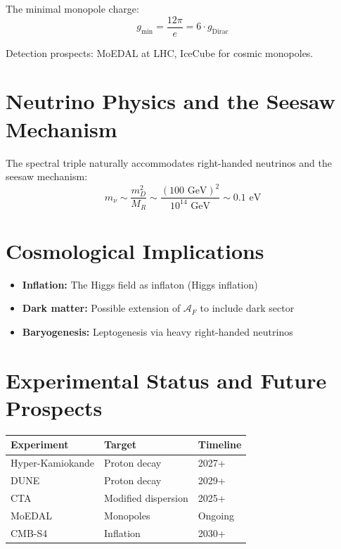 \documentclass[11pt,a4paper,openright]{book}
\theoremstyle{plain}
\theoremstyle{definition}
\newcommand{\A}{\mathcal{A}}
\begin{document}
The minimal monopole charge:
\begin{equation}
g_{\min} = \frac{12\pi}{e} = 6 \cdot g_{\mathrm{Dirac}}
\end{equation}

Detection prospects: MoEDAL at LHC, IceCube for cosmic monopoles.

\section{Neutrino Physics and the Seesaw Mechanism}

The spectral triple naturally accommodates right-handed neutrinos and the seesaw mechanism:
\begin{equation}
m_\nu \sim \frac{m_D^2}{M_R} \sim \frac{(100 \text{ GeV})^2}{10^{14} \text{ GeV}} \sim 0.1 \text{ eV}
\end{equation}

\section{Cosmological Implications}

\begin{itemize}
    \item \textbf{Inflation:} The Higgs field as inflaton (Higgs inflation)
    \item \textbf{Dark matter:} Possible extension of $\A_F$ to include dark sector
    \item \textbf{Baryogenesis:} Leptogenesis via heavy right-handed neutrinos
\end{itemize}

\section{Experimental Status and Future Prospects}

\begin{center}
\begin{tabular}{lll}
\toprule
\textbf{Experiment} & \textbf{Target} & \textbf{Timeline} \\
\midrule
Hyper-Kamiokande & Proton decay & 2027+ \\
DUNE & Proton decay & 2029+ \\
CTA & Modified dispersion & 2025+ \\
MoEDAL & Monopoles & Ongoing \\
CMB-S4 & Inflation & 2030+ \\
\bottomrule
\end{tabular}
\end{center}
\end{document}

